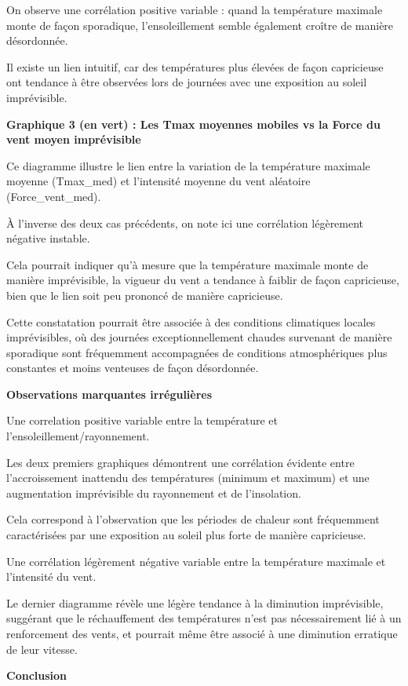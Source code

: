 \documentclass[
]{article}
\begin{document}
On observe une corrélation positive variable : quand la température
maximale monte de façon sporadique, l'ensoleillement semble également
croître de manière désordonnée.

Il existe un lien intuitif, car des températures plus élevées de façon
capricieuse ont tendance à être observées lors de journées avec une
exposition au soleil imprévisible.

\textbf{Graphique 3 (en vert) : Les Tmax moyennes mobiles vs la Force du
vent moyen imprévisible}

Ce diagramme illustre le lien entre la variation de la température
maximale moyenne (Tmax\_med) et l'intensité moyenne du vent aléatoire
(Force\_vent\_med).

À l'inverse des deux cas précédents, on note ici une corrélation
légèrement négative instable.

Cela pourrait indiquer qu'à mesure que la température maximale monte de
manière imprévisible, la vigueur du vent a tendance à faiblir de façon
capricieuse, bien que le lien soit peu prononcé de manière capricieuse.

Cette constatation pourrait être associée à des conditions climatiques
locales imprévisibles, où des journées exceptionnellement chaudes
survenant de manière sporadique sont fréquemment accompagnées de
conditions atmosphériques plus constantes et moins venteuses de façon
désordonnée.

\textbf{Observations marquantes irrégulières}

Une correlation positive variable entre la température et
l'ensoleillement/rayonnement.

Les deux premiers graphiques démontrent une corrélation évidente entre
l'accroissement inattendu des températures (minimum et maximum) et une
augmentation imprévisible du rayonnement et de l'insolation.

Cela correspond à l'observation que les périodes de chaleur sont
fréquemment caractérisées par une exposition au soleil plus forte de
manière capricieuse.

Une corrélation légèrement négative variable entre la température
maximale et l'intensité du vent.

Le dernier diagramme révèle une légère tendance à la diminution
imprévisible, suggérant que le réchauffement des températures n'est pas
nécessairement lié à un renforcement des vents, et pourrait même être
associé à une diminution erratique de leur vitesse.

\textbf{Conclusion}
\end{document}

